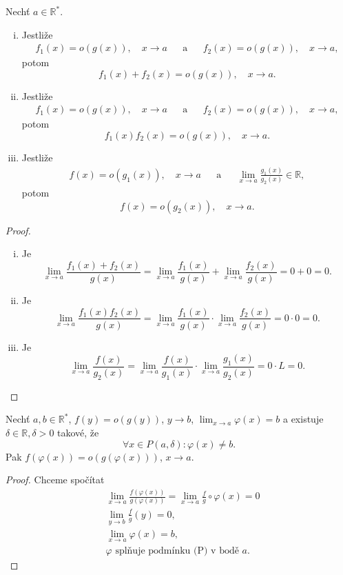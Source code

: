 \begin{veta}\label{veta6.6}
Nechť $a \in \mathbb{R}^*$.
\begin{enumerate}[(i)]
\item Jestliže
\begin{align*}
	f_1(x) = o(g(x)), \quad x \to a && \textrm{a} && f_2(x) = o(g(x)),\quad x \to a,
\end{align*}
potom
$$
f_1(x) + f_2(x) = o(g(x)), \quad x \to a.
$$
\item Jestliže
\begin{align*}
	f_1(x) = o(g(x)), \quad x \to a && \textrm{a} && f_2(x) = o(g(x)),\quad x \to a,
\end{align*}
potom
$$
f_1(x) f_2(x) = o(g(x)), \quad x \to a.
$$
\item Jestliže
\begin{align*}
	f(x) = o(g_1(x)), \quad x \to a && \textrm{a} && \lim_{x\to a} \frac{g_1(x)}{g_2(x)} \in \mathbb R ,
\end{align*}
potom
$$
f(x)  = o(g_2(x)), \quad x \to a.
$$
\end{enumerate}
\end{veta}

\begin{proof}\,
\begin{enumerate}[(i)]
	\item Je
	$$
		\lim_{x\to a} \frac{f_1(x)+f_2(x)}{g(x)}= \lim_{x\to a} \frac{f_1(x)}{g(x)} + \lim_{x\to a} \frac{f_2(x)}{g(x)} = 0+0=0.
	$$
	\item Je
	$$
	\lim_{x\to a} \frac{f_1(x)f_2(x)}{g(x)}= \lim_{x\to a} \frac{f_1(x)}{g(x)} \cdot  \lim_{x\to a} \frac{f_2(x)}{g(x)} = 0\cdot0=0.
	$$
	\item Je
	$$
 \lim_{x\to a} \frac{f(x)}{g_2(x)}=\lim_{x\to a} \frac{f(x)}{g_1(x)}\cdot \lim_{x\to a} \frac{g_1(x)}{g_2(x)} = 0\cdot L = 0.
	$$
	\qedhere
\end{enumerate}
\end{proof}

\begin{veta}\label{veta6.7}
Nechť $a,b \in \mathbb R ^*$, $f(y)=o(g(y))$, $y \to b$, $\lim_{x\to a}\varphi(x)=b$ a existuje $\delta\in \mathbb R , \delta>0$ takové, že
\[
\forall x \in P(a,\delta) : \varphi(x) \ne b.
\]
Pak $f(\varphi(x))=o(g(\varphi(x)))$, $x \to a$.
\end{veta}

\begin{proof}
	Chceme spočítat
	\begin{align*}
	&\lim_{x\to a} \frac{f(\varphi(x))}{g(\varphi(x))} = \lim_{x\to a} \frac{f}{g}\circ \varphi(x)=0\\
	&\lim_{y\to b} \frac{f}{g}(y)=0, \\
	&\lim_{x\to a} \varphi(x)=b,\\
	&\varphi \textrm{ splňuje podmínku (P) v bodě } a.
\end{align*}
\end{proof}

